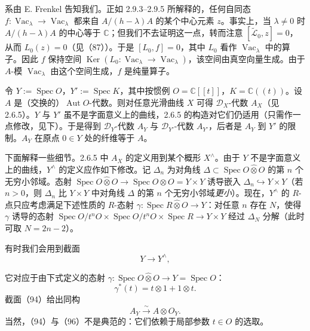 系由 E. Frenkel 告知我们。正如 2.9.3--2.9.5 所解释的，任何自同态 $f: \operatorname{Vac}_{\lambda} \to \operatorname{Vac}_{\lambda}$ 都来自 $A/(h-\lambda)A$ 的某个中心元素 $z$。事实上，当 $\lambda \ne 0$ 时 $A/(h-\lambda)A$ 的中心等于 $\mathbb{C}$；但我们不去证明这一点，转而注意 $[\widetilde{\mathcal{L}}_{0}, z] = 0$，从而 $L_{0}(z) = 0$（见（87））。于是 $[L_{0}, f] = 0$，其中 $L_{0}$ 看作 $\operatorname{Vac}_{\lambda}$ 中的算子。因此 $f$ 保持空间 $\operatorname{Ker}(L_{0}: \operatorname{Vac}_{\lambda} \to \operatorname{Vac}_{\lambda})$，该空间由真空向量生成。由于 $A$-模 $\operatorname{Vac}_{\lambda}$ 由这个空间生成，$f$ 是纯量算子。


 令 $Y := \operatorname{Spec} O$，$Y' := \operatorname{Spec} K$，其中按惯例 $O = \mathbb{C}[[t]]$，$K = \mathbb{C}((t))$。设 $A$ 是（交换的）$\operatorname{Aut} O$-代数。则对任意光滑曲线 $X$ 可得 $\mathcal{D}_{X}$-代数 $A_{X}$（见 2.6.5）。$Y$ 与 $Y'$ 虽不是字面意义上的曲线，2.6.5 的构造对它们仍适用（只需作一点修改，见下）。于是得到 $\mathcal{D}_{Y}$-代数 $A_{Y}$ 与 $\mathcal{D}_{Y'}$-代数 $A_{Y'}$，后者是 $A_{Y}$ 到 $Y'$ 的限制。$A_{Y}$ 在原点 $0 \in Y$ 处的纤维等于 $A$。

下面解释一些细节。2.6.5 中 $A_{X}$ 的定义用到某个概形 $X^{\wedge}$。由于 $Y$ 不是字面意义上的曲线，$Y^{\wedge}$ 的定义应作如下修改。记 $\Delta_{n}$ 为对角线 $\Delta \subset \operatorname{Spec} O\widehat{\otimes}O$ 的第 $n$ 个无穷小邻域。态射 $\operatorname{Spec} O\widehat{\otimes}O \to \operatorname{Spec} O\otimes O = Y\times Y$ 诱导嵌入 $\Delta_{n} \hookrightarrow Y\times Y$（若 $n > 0$，则 $\Delta_{n}$ 比 $Y\times Y$ 中对角线 $\Delta$ 的第 $n$ 个无穷小邻域\emph{更小}）。现在，$Y^{\wedge}$ 的 $R$-点只应考虑满足下述性质的 $R$-态射 $\gamma: \operatorname{Spec} R\widehat{\otimes}O \to Y$：对任意 $n$ 存在 $N$，使得 $\gamma$ 诱导的态射 $\operatorname{Spec} O/t^{n}O \times \operatorname{Spec} O/t^{n}O \times \operatorname{Spec} R \to Y\times Y$ 经过 $\Delta_{N}$ 分解（此时可取 $N = 2n-2$）。

 有时我们会用到截面
\begin{equation}\tag{94}
Y \to Y^{\wedge},
\end{equation}

它对应于由下式定义的态射 $\gamma: \operatorname{Spec} O\widehat{\otimes}O \to Y = \operatorname{Spec} O$：
\begin{equation}\tag{95}
\gamma^{*}(t) = t\otimes 1 + 1\otimes t.
\end{equation}
截面（94）给出同构
\begin{equation}\tag{96}
A_{Y} \xrightarrow{\sim} A\otimes O_{Y}.
\end{equation}
当然，（94）与（96）不是典范的：它们依赖于局部参数 $t \in O$ 的选取。

